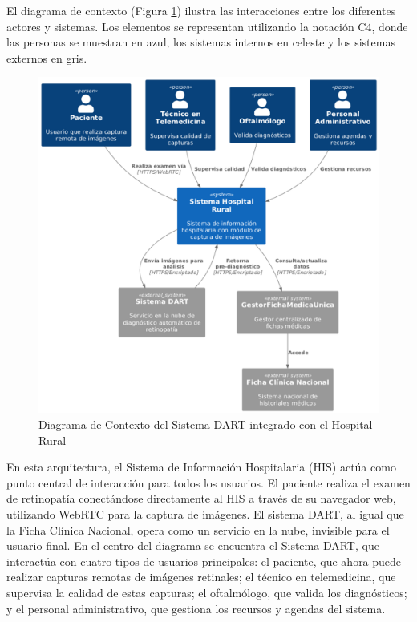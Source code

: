 El diagrama de contexto (Figura \ref{fig:dart_context}) ilustra las interacciones entre los diferentes actores y sistemas. Los elementos se representan utilizando la notación C4, donde las personas se muestran en azul, los sistemas internos en celeste y los sistemas externos en gris.

\begin{figure}[h]
    \centering
    \includegraphics[width=\textwidth]{Pictures/dart_context.png}
    \caption{Diagrama de Contexto del Sistema DART integrado con el Hospital Rural}
    \label{fig:dart_context}
\end{figure}

En esta arquitectura, el Sistema de Información Hospitalaria (HIS) actúa como punto central de interacción para todos los usuarios. El paciente realiza el examen de retinopatía conectándose directamente al HIS a través de su navegador web, utilizando WebRTC para la captura de imágenes. El sistema DART, al igual que la Ficha Clínica Nacional, opera como un servicio en la nube, invisible para el usuario final. En el centro del diagrama se encuentra el Sistema DART, que interactúa con cuatro tipos de usuarios principales: el paciente, que ahora puede realizar capturas remotas de imágenes retinales; el técnico en telemedicina, que supervisa la calidad de estas capturas; el oftalmólogo, que valida los diagnósticos; y el personal administrativo, que gestiona los recursos y agendas del sistema.

